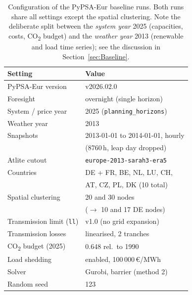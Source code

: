 \begin{table}[t]
  \centering
  \caption{Configuration of the PyPSA-Eur baseline runs. Both runs share all
  settings except the spatial clustering. Note the deliberate split between the
  \emph{system year} 2025 (capacities, costs, CO\textsubscript{2} budget) and the
  \emph{weather year} 2013 (renewable and load time series); see the discussion in
  Section~\ref{sec:Baseline}.}
  \label{tab:pypsa-settings}
  \begin{tabular}{@{}ll@{}}
    \toprule
    \textbf{Setting} & \textbf{Value} \\
    \midrule
    PyPSA-Eur version        & v2026.02.0 \\
    Foresight                & overnight (single horizon) \\
    System / price year      & 2025 (\texttt{planning\_horizons}) \\
    Weather year             & 2013 \\
    Snapshots                & 2013-01-01 to 2014-01-01, hourly \\
                             & (8760\,h, leap day dropped) \\
    Atlite cutout            & \texttt{europe-2013-sarah3-era5} \\
    Countries                & DE + FR, BE, NL, LU, CH, \\
                             & AT, CZ, PL, DK (10 total) \\
    Spatial clustering       & 20 and 30 nodes \\
                             & ($\rightarrow$ 10 and 17 DE nodes) \\
    Transmission limit (\texttt{ll})    & v1.0 (no grid expansion) \\
    Transmission losses      & linearised, 2 tranches \\
    CO\textsubscript{2} budget (2025)   & 0.648 rel.\ to 1990 \\
    Load shedding            & enabled, 100\,000\,\euro/MWh \\
    Solver                   & Gurobi, barrier (method 2) \\
    Random seed              & 123 \\
    \bottomrule
  \end{tabular}
\end{table}
